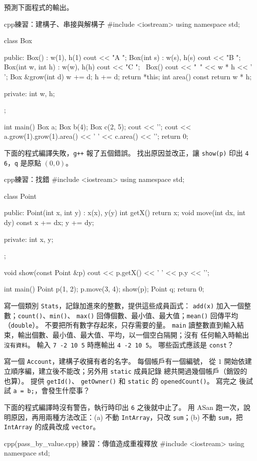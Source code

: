 \begin{drills}[label=drills:ch5]
\item 預測下面程式的輸出。
\begin{code}{cpp}{練習：建構子、串接與解構子}
#include <iostream>
using namespace std;

class Box {
public:
    Box() : w(1), h(1) { cout << "A "; }
    Box(int s) : w(s), h(s) { cout << "B "; }
    Box(int w, int h) : w(w), h(h) { cout << "C "; }
    ~Box() { cout << "~" << w * h << ' '; }
    Box &grow(int d) {
        w += d;
        h += d;
        return *this;
    }
    int area() const { return w * h; }

private:
    int w, h;
};

int main() {
    Box a;
    Box b(4);
    Box c(2, 5);
    cout << '\n';
    cout << a.grow(1).grow(1).area() << ' ' << c.area() << '\n';
    return 0;
}
\end{code}
\item 下面的程式編譯失敗，\texttt{g++} 報了五個錯誤。 找出原因並改正，讓 \texttt{show(p)} 印出
\texttt{4 6}，\texttt{q} 是原點 $(0, 0)$。
\begin{code}{cpp}{練習：找錯}
#include <iostream>
using namespace std;

class Point {
public:
    Point(int x, int y) : x(x), y(y) {}
    int getX() { return x; }
    void move(int dx, int dy) const {
        x += dx;
        y += dy;
    }

private:
    int x, y;
};

void show(const Point &p) {
    cout << p.getX() << ' ' << p.y << '\n';
}

int main() {
    Point p(1, 2);
    p.move(3, 4);
    show(p);
    Point q;
    return 0;
}
\end{code}
\item 寫一個類別 \texttt{Stats}，記錄加進來的整數，提供這些成員函式：
\texttt{add(x)} 加入一個整數；\texttt{count()}、\texttt{min()}、
\texttt{max()} 回傳個數、最小值、最大值；\texttt{mean()} 回傳平均
（\texttt{double}）。 不要把所有數字存起來，只存需要的量。 \texttt{main}
讀整數直到輸入結束，輸出個數、最小值、最大值、平均，以一個空白隔開；沒有
任何輸入時輸出 \texttt{沒有資料}。 輸入 \texttt{7 -2 10 5} 時應輸出
\texttt{4 -2 10 5}。 哪些函式應該是 \texttt{const}？
\item 寫一個 \texttt{Account}，建構子收擁有者的名字。 每個帳戶有一個編號，
從 $1$ 開始依建立順序編，建立後不能改；另外用 \texttt{static} 成員記錄
總共開過幾個帳戶（銷毀的也算）。 提供 \texttt{getId()}、
\texttt{getOwner()} 和 \texttt{static} 的 \texttt{openedCount()}。 寫完之
後試試 \texttt{a = b;}，會發生什麼事？
\item 下面的程式編譯時沒有警告，執行時印出 \texttt{6} 之後就中止了。 用
ASan 跑一次，說明原因，再用兩種方法改正：(a) 不動 \texttt{IntArray}，只改
\texttt{sum}；(b) 不動 \texttt{sum}，把 \texttt{IntArray} 的成員改成
\texttt{vector}。
\begin{code}{cpp}{(pass\_by\_value.cpp) 練習：傳值造成重複釋放}
#include <iostream>
using namespace std;


\end{code}
\end{drills}
